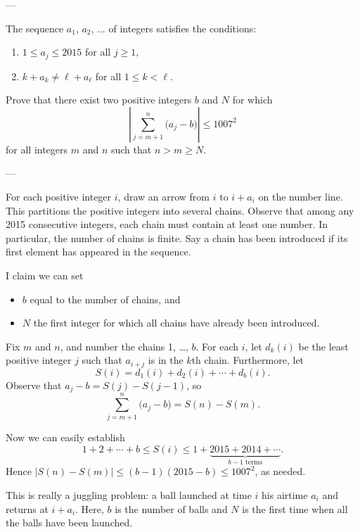 
---

The sequence $a_1$, $a_2$, $\ldots$ of integers satisfies the conditions:
\begin{enumerate}[label=(\roman*),itemsep=0em]
    \item $1\le a_j\le2015$ for all $j\ge1$,
    \item $k+a_k\ne\ell+a_\ell$ for all $1\le k<\ell$.
\end{enumerate}
Prove that there exist two positive integers $b$ and $N$ for which
\[\left\vert\sum_{j=m+1}^n\big(a_j-b\big)\right\vert\le1007^2\]
for all integers $m$ and $n$ such that $n>m\ge N$.

---

For each positive integer $i$, draw an arrow from $i$ to $i+a_i$ on the number line. This partitions the positive integers into several chains.
Observe that among any 2015 consecutive integers, each chain must contain at least one number. In particular, the number of chains is finite. Say a chain has been introduced if its first element has appeared in the sequence.

I claim we can set
\begin{itemize}[itemsep=0em]
    \item $b$ equal to the number of chains, and
    \item $N$ the first integer for which all chains have already been introduced.
\end{itemize}

Fix $m$ and $n$, and number the chains 1, \ldots, $b$. For each $i$, let $d_k(i)$ be the least positive integer $j$ such that $a_{i+j}$ is in the $k$th chain. Furthermore, let
\[S(i)=d_1(i)+d_2(i)+\cdots+d_b(i).\]
Observe that $a_j-b=S(j)-S(j-1)$, so
\[\sum_{j=m+1}^n\big(a_j-b\big)=S(n)-S(m).\]

Now we can easily establish
\[1+2+\cdots+b\le S(i)\le1+\underbrace{2015+2014+\cdots}_{b-1\text{ terms}}.\]
Hence $|S(n)-S(m)|\le(b-1)(2015-b)\le1007^2$, as needed.
\begin{remark}
    This is really a juggling problem: a ball launched at time $i$ his airtime $a_i$ and returns at $i+a_i$. Here, $b$ is the number of balls and $N$ is the first time when all the balls have been launched.
\end{remark}

